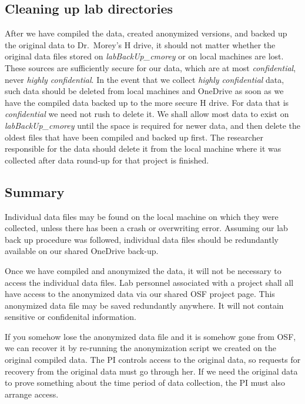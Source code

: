 \documentclass[
  12pt,
]{book}
\begin{document}
\subsection{Cleaning up lab directories}\label{cleaning-up-lab-directories}

After we have compiled the data, created anonymized versions, and backed up the original data to Dr.~Morey's H drive, it should not matter whether the original data files stored on \emph{labBackUp\_cmorey} or on local machines are lost. These sources are sufficiently secure for our data, which are at most \emph{confidential}, never \emph{highly confidential}. In the event that we collect \emph{highly confidential} data, such data should be deleted from local machines and OneDrive as soon as we have the compiled data backed up to the more secure H drive. For data that is \emph{confidential} we need not rush to delete it. We shall allow most data to exist on \emph{labBackUp\_cmorey} until the space is required for newer data, and then delete the oldest files that have been compiled and backed up first. The researcher responsible for the data should delete it from the local machine where it was collected after data round-up for that project is finished.

\subsection{Summary}\label{summary}

Individual data files may be found on the local machine on which they were collected, unless there has been a crash or overwriting error. Assuming our lab back up procedure was followed, individual data files should be redundantly available on our shared OneDrive back-up.

Once we have compiled and anonymized the data, it will not be necessary to access the individual data files. Lab personnel associated with a project shall all have access to the anonymized data via our shared OSF project page. This anonymized data file may be saved redundantly anywhere. It will not contain sensitive or confidenital information.

If you somehow lose the anonymized data file and it is somehow gone from OSF, we can recover it by re-running the anonymization script we created on the original compiled data. The PI controls access to the original data, so requests for recovery from the original data must go through her. If we need the original data to prove something about the time period of data collection, the PI must also arrange access.
\end{document}
